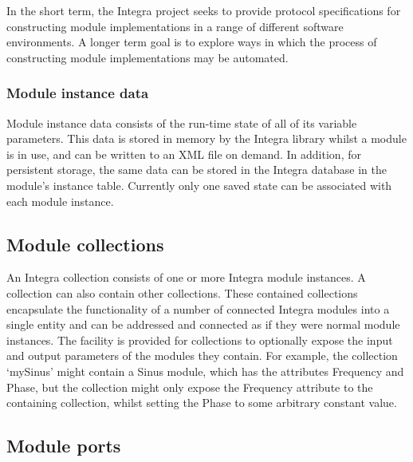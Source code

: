 \documentclass[10pt,journal,final]{IEEEtran}
\begin{document}
In the short term, the Integra project seeks to provide protocol specifications for constructing module implementations in a range of different software environments. A longer term goal is to explore ways in which the process of constructing module implementations may be automated.

\subsubsection{Module instance data}\label{subsubsec:module_instance_data}

Module instance data consists of the run-time state of all of its variable parameters. This data is stored in memory by the Integra library whilst a module is in use, and can be written to an XML file on demand. In addition, for persistent storage, the same data can be stored in the Integra database in the module's instance table. Currently only one saved state can be associated with each module instance.

\subsection{Module collections}\label{subsec:module_collections}

An Integra collection consists of one or more Integra module instances. A collection can also contain other collections. These contained collections encapsulate the functionality of a number of connected Integra modules into a single entity and can be addressed and connected as if they were normal module instances. The facility is provided for collections to optionally expose the input and output parameters of the modules they contain. For example, the collection `mySinus' might contain a Sinus module, which has the attributes Frequency and Phase, but the collection might only expose the Frequency attribute to the containing collection, whilst setting the Phase to some arbitrary constant value.

\subsection{Module ports}\label{subsec:module_ports}
\end{document}
